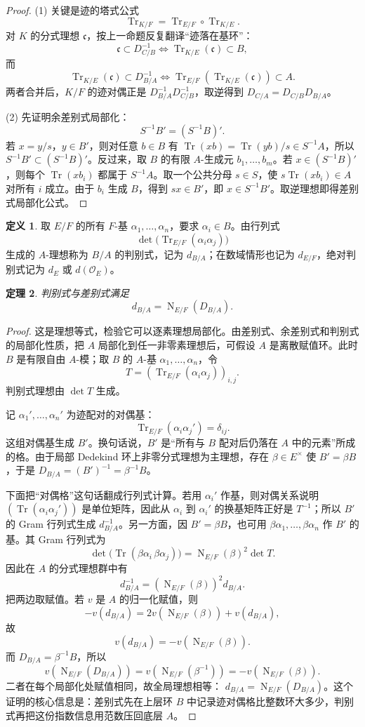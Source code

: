 \documentclass[11pt,a4paper,openany]{ctexbook}
\numberwithin{equation}{chapter}
\newcommand{\Tr}{\operatorname{Tr}}
\newcommand{\Nm}{\operatorname{N}}
\theoremstyle{plain}
\newtheorem{theorem}{定理}[chapter]
\theoremstyle{definition}
\newtheorem{definition}[theorem]{定义}
\theoremstyle{remark}
\begin{document}
\begin{proof}
(1) 关键是迹的塔式公式
\[
\Tr_{K/F}=\Tr_{E/F}\circ\Tr_{K/E}.
\]
对 $K$ 的分式理想 $\mathfrak c$，按上一命题反复翻译“迹落在基环”：
\[
\mathfrak c\subset D_{C/B}^{-1}
\Longleftrightarrow
\Tr_{K/E}(\mathfrak c)\subset B,
\]
而
\[
\Tr_{K/E}(\mathfrak c)\subset D_{B/A}^{-1}
\Longleftrightarrow
\Tr_{E/F}(\Tr_{K/E}(\mathfrak c))\subset A.
\]
两者合并后，$K/F$ 的迹对偶正是 $D_{B/A}^{-1}D_{C/B}^{-1}$，取逆得到
$D_{C/A}=D_{C/B}D_{B/A}$。

(2) 先证明余差别式局部化：
\[
S^{-1}B'=(S^{-1}B)'.
\]
若 $x=y/s$，$y\in B'$，则对任意 $b\in B$ 有 $\Tr(xb)=\Tr(yb)/s\in S^{-1}A$，所以 $S^{-1}B'\subset(S^{-1}B)'$。反过来，取 $B$ 的有限 $A$-生成元 $b_1,\dots,b_m$。若 $x\in(S^{-1}B)'$，则每个 $\Tr(xb_i)$ 都属于 $S^{-1}A$。取一个公共分母 $s\in S$，使 $s\Tr(xb_i)\in A$ 对所有 $i$ 成立。由于 $b_i$ 生成 $B$，得到 $sx\in B'$，即 $x\in S^{-1}B'$。取逆理想即得差别式局部化公式。
\end{proof}

\begin{definition}
取 $E/F$ 的所有 $F$-基 $\alpha_1,\dots,\alpha_n$，要求 $\alpha_i\in B$。由行列式
\[
\det\bigl(\Tr_{E/F}(\alpha_i\alpha_j)\bigr)
\]
生成的 $A$-理想称为 $B/A$ 的判别式，记为 $d_{B/A}$；在数域情形也记为 $d_{E/F}$，绝对判别式记为 $d_E$ 或 $d(\mathcal O_E)$。
\end{definition}

\begin{theorem}
判别式与差别式满足
\[
d_{B/A}=\Nm_{E/F}(D_{B/A}).
\]
\end{theorem}

\begin{proof}
这是理想等式，检验它可以逐素理想局部化。由差别式、余差别式和判别式的局部化性质，把
$A$ 局部化到任一非零素理想后，可假设 $A$ 是离散赋值环。此时 $B$ 是有限自由
$A$-模；取 $B$ 的 $A$-基 $\alpha_1,\dots,\alpha_n$，令
\[
T=(\Tr_{E/F}(\alpha_i\alpha_j))_{i,j}.
\]
判别式理想由 $\det T$ 生成。

记 $\alpha_1',\dots,\alpha_n'$ 为迹配对的对偶基：
\[
\Tr_{E/F}(\alpha_i\alpha_j')=\delta_{ij}.
\]
这组对偶基生成 $B'$。换句话说，$B'$ 是“所有与 $B$ 配对后仍落在
$A$ 中的元素”所成的格。由于局部 Dedekind 环上非零分式理想为主理想，存在
$\beta\in E^\times$ 使 $B'=\beta B$，于是 $D_{B/A}=(B')^{-1}=\beta^{-1}B$。

下面把“对偶格”这句话翻成行列式计算。若用 $\alpha_i'$ 作基，则对偶关系说明
$(\Tr(\alpha_i\alpha_j'))$ 是单位矩阵，因此从 $\alpha_i$ 到 $\alpha_i'$ 的换基矩阵正好是
$T^{-1}$；所以 $B'$ 的 Gram 行列式生成 $d_{B/A}^{-1}$。另一方面，因
$B'=\beta B$，也可用 $\beta\alpha_1,\dots,\beta\alpha_n$ 作 $B'$ 的基。其 Gram 行列式为
\[
\det\bigl(\Tr(\beta\alpha_i\,\beta\alpha_j)\bigr)
=\Nm_{E/F}(\beta)^2\det T.
\]
因此在 $A$ 的分式理想群中有
\[
d_{B/A}^{-1}=(\Nm_{E/F}(\beta))^2d_{B/A}.
\]
把两边取赋值。若 $v$ 是 $A$ 的归一化赋值，则
\[
-v(d_{B/A})=2v(\Nm_{E/F}(\beta))+v(d_{B/A}),
\]
故
\[
v(d_{B/A})=-v(\Nm_{E/F}(\beta)).
\]
而 $D_{B/A}=\beta^{-1}B$，所以
\[
v(\Nm_{E/F}(D_{B/A}))=v(\Nm_{E/F}(\beta^{-1}))=-v(\Nm_{E/F}(\beta)).
\]
二者在每个局部化处赋值相同，故全局理想相等：
$d_{B/A}=\Nm_{E/F}(D_{B/A})$。这个证明的核心信息是：差别式先在上层环 $B$
中记录迹对偶格比整数环大多少，判别式再把这份指数信息用范数压回底层 $A$。
\end{proof}
\end{document}
